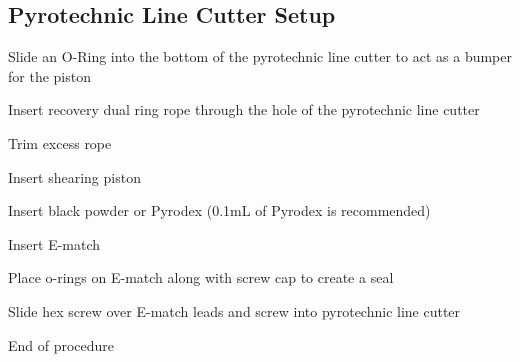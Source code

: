     \subsection{Pyrotechnic Line Cutter Setup}
        \begin{checklist}
            \item Slide an O-Ring into the bottom of the pyrotechnic line cutter to act as a bumper for the piston
            \item Insert recovery dual ring rope through the hole of the pyrotechnic line cutter
            \item Trim excess rope 
            \item Insert shearing piston
            \item Insert black powder or Pyrodex (0.1mL of Pyrodex is recommended)
            \item Insert E-match
            \item Place o-rings on E-match along with screw cap to create a seal
            \item Slide hex screw over E-match leads and screw into pyrotechnic line cutter
            \item End of procedure
        \end{checklist}

